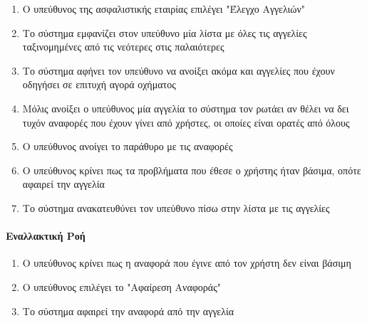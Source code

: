 \documentclass{../ol-softwaremanual}
\begin{document}
    \begin{enumerate}
    	\item Ο υπεύθυνος της ασφαλιστικής εταιρίας επιλέγει \en"\gr Έλεγχο Αγγελιών\en"\gr
    	\item Το σύστημα εμφανίζει στον υπεύθυνο μία λίστα με όλες τις αγγελίες ταξινομημένες από τις νεότερες στις παλαιότερες
    	\item Το σύστημα αφήνει τον υπεύθυνο να ανοίξει ακόμα και αγγελίες που έχουν οδηγήσει σε επιτυχή αγορά οχήματος
    	\item Μόλις ανοίξει ο υπεύθυνος μία αγγελία το σύστημα τον ρωτάει αν θέλει να δει τυχόν αναφορές που έχουν γίνει από χρήστες, οι οποίες είναι ορατές από όλους
    	\item Ο υπεύθυνος ανοίγει το παράθυρο με τις αναφορές
    	\item Ο υπεύθυνος κρίνει πως τα προβλήματα που έθεσε ο χρήστης ήταν βάσιμα, οπότε αφαιρεί την αγγελία
    	\item Το σύστημα ανακατευθύνει τον υπεύθυνο πίσω στην λίστα με τις αγγελίες
    \end{enumerate}
    
    \paragraph{Εναλλακτική Ροή }
    \begin{enumerate}
    	\item Ο υπεύθυνος κρίνει πως η αναφορά που έγινε από τον χρήστη δεν είναι βάσιμη
    	\item Ο υπεύθυνος επιλέγει το \en"\gr Αφαίρεση Αναφοράς\en"\gr
    	\item Το σύστημα αφαιρεί την αναφορά από την αγγελία
    \end{enumerate}
\end{document}
